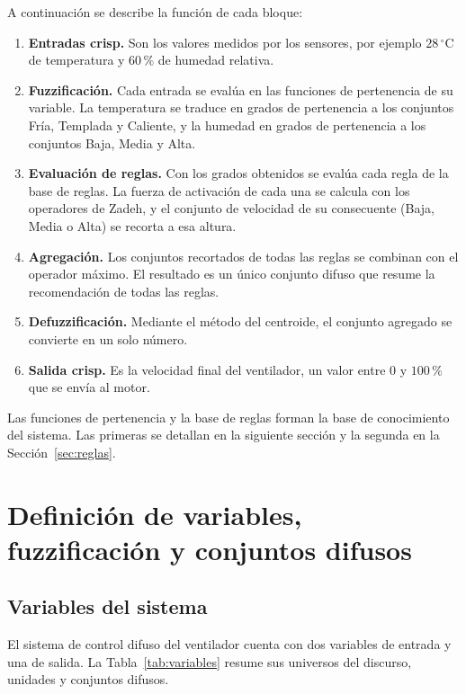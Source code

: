 \documentclass[11pt]{article}
\begin{document}
A continuación se describe la función de cada bloque:
\begin{enumerate}
  \item \textbf{Entradas crisp.} Son los valores medidos por los sensores, por ejemplo $28\,^\circ$C de temperatura y $60\,\%$ de humedad relativa.
  \item \textbf{Fuzzificación.} Cada entrada se evalúa en las funciones de pertenencia de su variable. La temperatura se traduce en grados de pertenencia a los conjuntos Fría, Templada y Caliente, y la humedad en grados de pertenencia a los conjuntos Baja, Media y Alta.
  \item \textbf{Evaluación de reglas.} Con los grados obtenidos se evalúa cada regla de la base de reglas. La fuerza de activación de cada una se calcula con los operadores de Zadeh, y el conjunto de velocidad de su consecuente (Baja, Media o Alta) se recorta a esa altura.
  \item \textbf{Agregación.} Los conjuntos recortados de todas las reglas se combinan con el operador máximo. El resultado es un único conjunto difuso que resume la recomendación de todas las reglas.
  \item \textbf{Defuzzificación.} Mediante el método del centroide, el conjunto agregado se convierte en un solo número.
  \item \textbf{Salida crisp.} Es la velocidad final del ventilador, un valor entre 0 y $100\,\%$ que se envía al motor.
\end{enumerate}

Las funciones de pertenencia y la base de reglas forman la base de conocimiento del sistema. Las primeras se detallan en la siguiente sección y la segunda en la Sección~\ref{sec:reglas}.

\section{Definición de variables, fuzzificación y conjuntos difusos}

\subsection{Variables del sistema}

El sistema de control difuso del ventilador cuenta con dos variables de entrada y una de salida. La Tabla~\ref{tab:variables} resume sus universos del discurso, unidades y conjuntos difusos.
\end{document}
